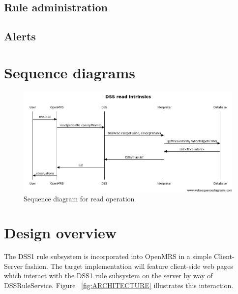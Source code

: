 \documentclass[12pt,letterpaper]{article}
\begin{document}
\subsection{Rule administration}

\subsection{Alerts}

\newpage 
\section{Sequence diagrams}

\begin{figure}\begin{center}
\includegraphics[width=6.5in]{readsequence.png}
\end{center}
\caption{Sequence diagram for read operation} 
\label{fig:SEQUENCE_READ}
\end{figure}


\newpage 
\section{Design overview} \label{sec:DESIGN_OVERVIEW}

	The DSS1 rule subsystem is incorporated into OpenMRS in a simple Client-Server fashion. The target implementation will feature client-side web pages which interact with the DSS1 rule subsystem on the server by way of DSSRuleService. Figure 
~\ref{fig:ARCHITECTURE} illustrates this interaction.
\end{document}
